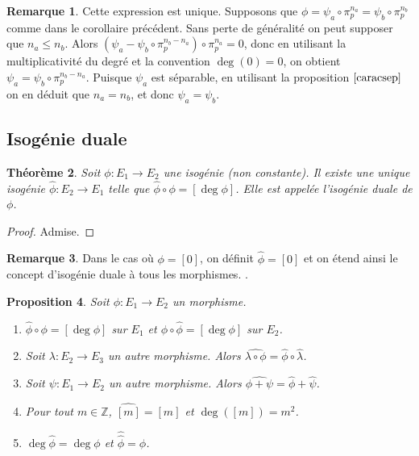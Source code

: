 \documentclass{article}
\theoremstyle{plain}%
\newtheorem{thm}{Théorème}[section]
\newtheorem{prop}[thm]{Proposition}
\theoremstyle{definition}%
\newtheorem{rem}[thm]{Remarque}
\newcommand{\Z}{\mathbb{Z}}
\newcommand{\h}{\widehat}
\begin{document}
\begin{rem}
  Cette expression est unique. Supposons que $\phi = \psi_a \circ \pi_p^{n_a} = \psi_b \circ \pi_p^{n_b}$ comme dans le corollaire précédent. Sans perte de généralité on peut supposer que $n_a \le n_b$. Alors $(\psi_a - \psi_b \circ \pi_p^{n_b - n_a}) \circ \pi_p^{n_a} = 0$, donc en utilisant la multiplicativité du degré et la convention $\deg(0) = 0$, on obtient $\psi_a = \psi_b \circ \pi_p^{n_b - n_a}$. Puisque $\psi_a$ est séparable, en utilisant la proposition $\ref{caracsep}$ on en déduit que $n_a = n_b$, et donc $\psi_a = \psi_b$.
\end{rem}

\subsection{Isogénie duale}

\begin{thm}
  \label{existence_duale}
  Soit $\phi : E_1\to E_2$ une isogénie (non constante). Il existe une unique isogénie $\h\phi : E_2\to E_1$ telle que $\h\phi \circ \phi = [\deg\phi]$. Elle est appelée l'isogénie duale de $\phi$.
\end{thm}

\begin{proof}
  Admise. 
\end{proof}

\begin{rem}
Dans le cas où $\phi = [0]$, on définit $\h\phi = [0]$ et on étend ainsi le concept d'isogénie duale à tous les morphismes. .
\end{rem}

\begin{prop}
  \label{propriétés_duale}
  Soit $\phi : E_1 \to E_2$ un morphisme.  
  \begin{enumerate}
    \item $\h\phi\circ\phi = [\deg{\phi}]$ sur $E_1$ et $\phi\circ\h\phi = [\deg{\phi}]$ sur $E_2$.
    \item Soit $\lambda :E_2\to E_3$ un autre morphisme. Alors $\h{\lambda\circ\phi} = \h\phi\circ\h\lambda$.
    \item Soit $\psi :E_1\to E_2$ un autre morphisme. Alors $\h{\phi+\psi} = \h\phi + \h\psi$.
    \item Pour tout $m\in\Z$, $\h{[m]} = [m]$ et $\deg([m]) = m^2$.
    \item $\deg\h\phi = \deg\phi$ et $\h{\h\phi} = \phi$.
  \end{enumerate}
\end{prop}
\end{document}
